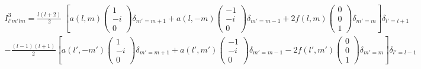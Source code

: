 \documentclass[aps,prb,floatfix,epsfig,singlecolumn,showpacs,preprintnumbers]{revtex4}
\begin{document}
\begin{eqnarray}
I^3_{l'm'lm}=\frac{l(l+2)}{2}\;
\left[
a(l,m)
\left(
\begin{array}{c}
1\\
-i\\
0
\end{array}
\right)
\delta_{m'=m+1}
+a(l,-m)
\left(
\begin{array}{c}
-1\\
-i\\
0
\end{array}
\right)
\delta_{m'=m-1}
+2 f(l,m)
\left(
\begin{array}{c}
0\\
0\\
1
\end{array}
\right)
\delta_{m'=m}
\right]\delta_{l'=l+1}
\nonumber\\
-\frac{(l-1)(l+1)}{2}
\left[
a(l',-m')
\left(
\begin{array}{c}
1\\
-i\\
0
\end{array}
\right)
\delta_{m'=m+1}
+a(l',m')
\left(
\begin{array}{c}
-1\\
-i\\
0
\end{array}
\right)
\delta_{m'=m-1}
-2 f(l',m')
\left(
\begin{array}{c}
0\\
0\\
1
\end{array}
\right)
\delta_{m'=m}
\right]\delta_{l'=l-1}
\end{eqnarray}
\end{document}
